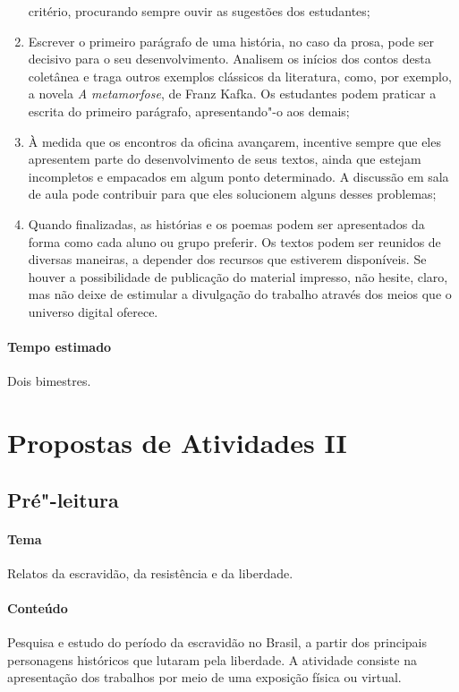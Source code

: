 \documentclass[12pt]{extarticle}
\begin{document}
\begin{enumerate}
  critério, procurando sempre ouvir as sugestões dos estudantes;
\item
  Escrever o primeiro parágrafo de uma história, no caso da prosa, pode
  ser decisivo para o seu desenvolvimento. Analisem os inícios dos
  contos desta coletânea e traga outros exemplos clássicos da
  literatura, como, por exemplo, a novela \emph{A metamorfose}, de Franz
  Kafka. Os estudantes podem praticar a escrita do primeiro parágrafo,
  apresentando"-o aos demais;
\item
  À medida que os encontros da oficina avançarem, incentive sempre que
  eles apresentem parte do desenvolvimento de seus textos, ainda que
  estejam incompletos e empacados em algum ponto determinado. A
  discussão em sala de aula pode contribuir para que eles solucionem
  alguns desses problemas;
\item
  Quando finalizadas, as histórias e os poemas podem ser apresentados da
  forma como cada aluno ou grupo preferir. Os textos podem ser reunidos
  de diversas maneiras, a depender dos recursos que estiverem
  disponíveis. Se houver a possibilidade de publicação do material
  impresso, não hesite, claro, mas não deixe de estimular a divulgação
  do trabalho através dos meios que o universo digital oferece.
\end{enumerate}

\paragraph{Tempo estimado} Dois bimestres.

\section{Propostas de Atividades II}

\subsection{Pré"-leitura}

\paragraph{Tema} Relatos da escravidão, da resistência e da liberdade.
  
\paragraph{Conteúdo} Pesquisa e estudo do período da escravidão no Brasil,
a partir dos principais personagens históricos que lutaram pela
liberdade. A atividade consiste na apresentação dos trabalhos por meio
de uma exposição física ou virtual.
\end{document}
